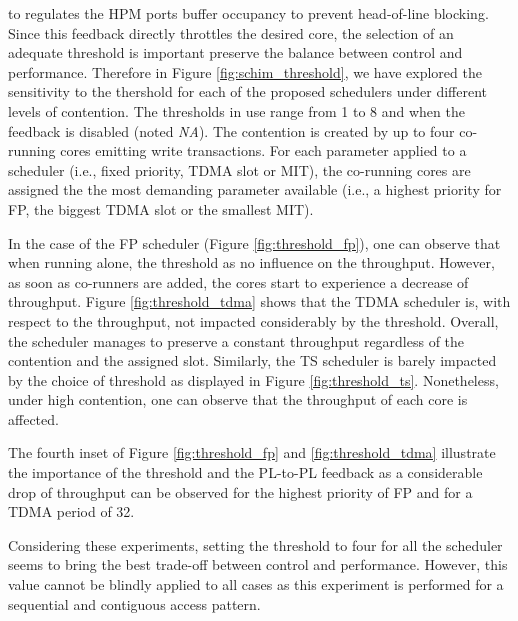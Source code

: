 \schim to regulates the HPM ports buffer occupancy to prevent head-of-line blocking.
Since this feedback directly throttles the desired core, the selection of an adequate
threshold is important preserve the balance between control and performance.
Therefore in Figure \ref{fig:schim_threshold}, we have explored the sensitivity
to the thershold for each of the proposed schedulers under different levels of contention.
The thresholds in use range from 1 to 8 and when the feedback is disabled
(noted \emph{NA}). The contention is created by up to four co-running cores emitting
write transactions. For each parameter applied to a scheduler (i.e., fixed
priority, TDMA slot or MIT), the co-running cores are assigned the the most
demanding parameter available (i.e., a highest priority for FP, the biggest TDMA
slot or the smallest MIT).

In the case of the FP scheduler (Figure \ref{fig:threshold_fp}), one can observe
that when running alone, the threshold as no influence on the throughput.
However, as soon as co-runners are added, the cores start to experience a
decrease of throughput.
Figure \ref{fig:threshold_tdma} shows that the TDMA scheduler is, with respect
to the throughput, not impacted considerably by the threshold. Overall, the
scheduler manages to preserve a constant throughput regardless of the contention
and the assigned slot.
Similarly, the TS scheduler is barely impacted by the choice of threshold as
displayed in Figure \ref{fig:threshold_ts}. Nonetheless, under high
contention, one can observe that the throughput of each core is affected.

The fourth inset of Figure \ref{fig:threshold_fp} and \ref{fig:threshold_tdma}
illustrate the importance of the threshold and the PL-to-PL feedback as a
considerable drop of throughput can be observed for the highest priority of FP
and for a TDMA period of 32.

Considering these experiments, setting the threshold to four for all the scheduler
seems to bring the best trade-off between control and performance. However, this
value cannot be blindly applied to all cases as this experiment is performed for
a sequential and contiguous access pattern.

